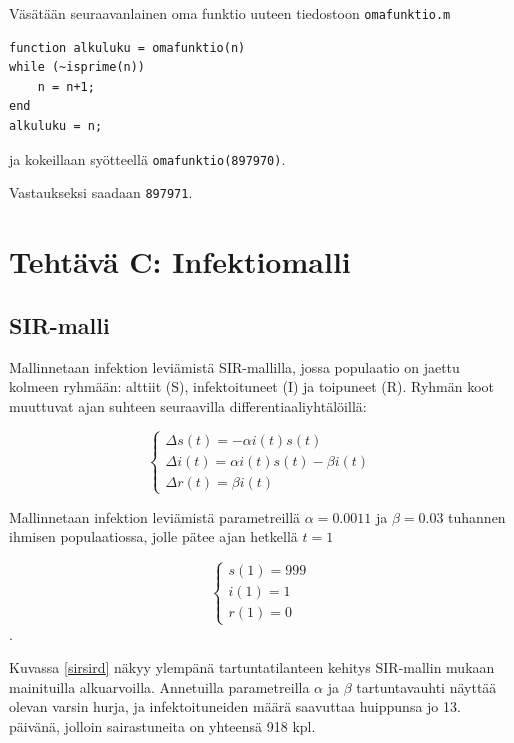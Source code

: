 \documentclass[a4paper,11pt]{article}
\begin{document}
{Väsätään seuraavanlainen oma funktio uuteen tiedostoon \texttt{omafunktio.m}

\begin{lstlisting}
function alkuluku = omafunktio(n)
while (~isprime(n))
    n = n+1;
end
alkuluku = n;
\end{lstlisting}

ja kokeillaan syötteellä \texttt{omafunktio(897970)}.

Vastaukseksi saadaan \texttt{897971}.

\clearpage

\section{Tehtävä C: Infektiomalli}

\subsection{SIR-malli}

Mallinnetaan infektion leviämistä SIR-mallilla, jossa populaatio on jaettu kolmeen ryhmään: alttiit (S), infektoituneet (I) ja toipuneet (R). Ryhmän koot muuttuvat ajan suhteen seuraavilla differentiaaliyhtälöillä:

\begin{equation}
\begin{cases}
\Delta s(t) = -\alpha i(t) s(t) \\
\Delta i(t) = \alpha i(t) s(t) - \beta i(t) \\
\Delta r(t) = \beta i(t)
\end{cases}
\end{equation}

Mallinnetaan infektion leviämistä parametreillä $\alpha = 0.0011$ ja $\beta = 0.03$ tuhannen ihmisen populaatiossa, jolle pätee ajan hetkellä $t=1$

\begin{equation}
\begin{cases}
s(1) = 999 \\
i(1) = 1 \\
r(1) = 0
\end{cases}
\end{equation}.

Kuvassa \ref{sirsird} näkyy ylempänä tartuntatilanteen kehitys SIR-mallin mukaan mainituilla alkuarvoilla. Annetuilla parametreilla $\alpha$ ja $\beta$ tartuntavauhti näyttää olevan varsin hurja, ja infektoituneiden määrä saavuttaa huippunsa jo 13. päivänä, jolloin sairastuneita on yhteensä 918 kpl.

}
\end{document}
